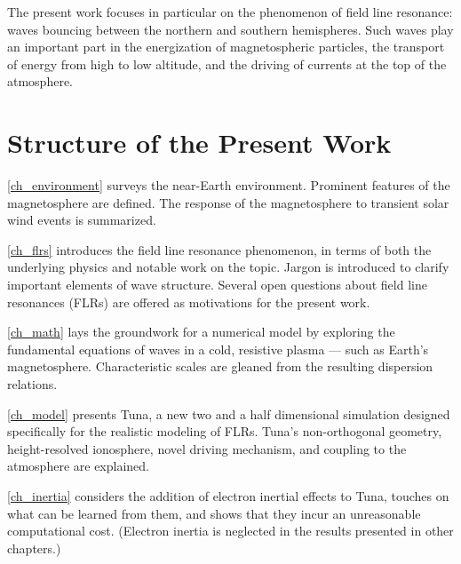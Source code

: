 The present work focuses in particular on the phenomenon of field line resonance: \Alfven waves bouncing between the northern and southern hemispheres. Such waves play an important part in the energization of magnetospheric particles, the transport of energy from high to low altitude, and the driving of currents at the top of the atmosphere. 







\section{Structure of the Present Work}

\cref{ch_environment} surveys the near-Earth environment. Prominent features of the magnetosphere are defined. The response of the magnetosphere to transient solar wind events is summarized. 

\cref{ch_flrs} introduces the field line resonance phenomenon, in terms of both the underlying physics and notable work on the topic. Jargon is introduced to clarify important elements of wave structure. Several open questions about field line resonances (FLRs) are offered as motivations for the present work. 

\cref{ch_math} lays the groundwork for a numerical model by exploring the fundamental equations of waves in a cold, resistive plasma --- such as Earth's magnetosphere. Characteristic scales are gleaned from the resulting dispersion relations. 

\cref{ch_model} presents Tuna, a new two and a half dimensional simulation designed specifically for the realistic modeling of FLRs. Tuna's non-orthogonal geometry, height-resolved ionosphere, novel driving mechanism, and coupling to the atmosphere are explained. 

\cref{ch_inertia} considers the addition of electron inertial effects to Tuna, touches on what can be learned from them, and shows that they incur an unreasonable computational cost. (Electron inertia is neglected in the results presented in other chapters.) 

